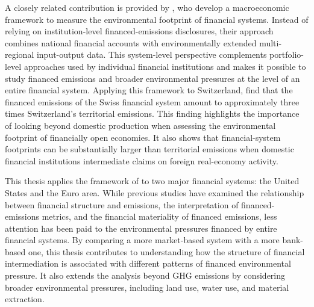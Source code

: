 A closely related contribution is provided by \textcite{jondeau_environmental_2026}, who develop a macroeconomic framework to measure the environmental footprint of financial systems. Instead of relying on institution-level financed-emissions disclosures, their approach combines national financial accounts with environmentally extended multi-regional input-output data. This system-level perspective complements portfolio-level approaches used by individual financial institutions and makes it possible to study financed emissions and broader environmental pressures at the level of an entire financial system. Applying this framework to Switzerland, \textcite{jondeau_environmental_2026} find that the financed emissions of the Swiss financial system amount to approximately three times Switzerland's territorial emissions. This finding highlights the importance of looking beyond domestic production when assessing the environmental footprint of financially open economies. It also shows that financial-system footprints can be substantially larger than territorial emissions when domestic financial institutions intermediate claims on foreign real-economy activity.

This thesis applies the framework of \textcite{jondeau_environmental_2026} to two major financial systems: the United States and the Euro area. While previous studies have examined the relationship between financial structure and emissions, the interpretation of financed-emissions metrics, and the financial materiality of financed emissions, less attention has been paid to the environmental pressures financed by entire financial systems. By comparing a more market-based system with a more bank-based one, this thesis contributes to understanding how the structure of financial intermediation is associated with different patterns of financed environmental pressure. It also extends the analysis beyond GHG emissions by considering broader environmental pressures, including land use, water use, and material extraction.












